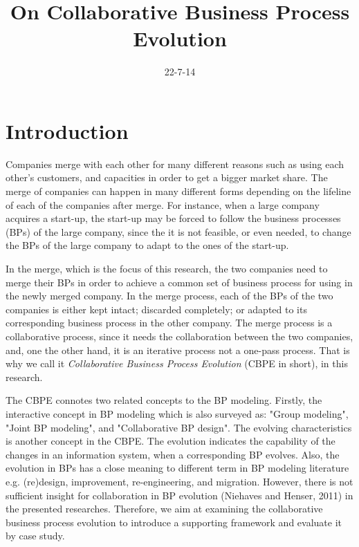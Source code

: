 \documentclass{article}
\begin{document}
\title{On Collaborative Business Process Evolution}

\date{22-7-14}
\maketitle

\section{Introduction}
Companies merge with each other for many different reasons such as using each other's customers, and capacities in order to get a bigger market share.
The merge of companies can happen in many different forms depending on the lifeline of each of the companies after merge.
For instance, when a large company acquires a start-up, the start-up may be forced to follow the business processes (BPs) of the large company, since the it is not feasible, or even needed, to change the BPs of the large company to adapt to the ones of the start-up.

In the merge, which is the focus of this research, the two companies need to merge their BPs in order to achieve a common set of business process for using in the newly merged company.
In the merge process, each of the BPs of the two companies is either kept intact; discarded completely; or adapted to its corresponding business process in the other company.
The merge process is a collaborative process, since it needs the collaboration between the two companies, and, one the other hand, it is an iterative process not a one-pass process.
That is why we call it \emph{Collaborative Business Process Evolution} (CBPE in short), in this research.

  
The CBPE connotes two related concepts to the BP modeling. Firstly, the interactive concept  in BP modeling which is also surveyed as: "Group modeling", "Joint BP modeling", and "Collaborative BP design". The evolving characteristics is another concept in the CBPE. The evolution  indicates the capability of the changes in an information system, when a corresponding  BP evolves. Also, the evolution in BPs has a close meaning to  different term in BP modeling literature e.g. (re)design, improvement, re-engineering, and migration. 
However, there is not sufficient insight for collaboration in BP evolution (Niehaves and Henser, 2011) in the presented researches. Therefore, we aim at examining the collaborative business process evolution to introduce a supporting framework and evaluate it by case study.
\end{document}
